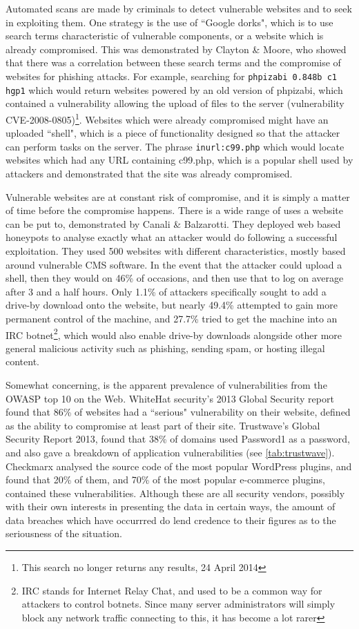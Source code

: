 \documentclass{acm_proc_article-sp}
\begin{document}
Automated scans are made by criminals to detect vulnerable websites and to seek in exploiting them.  One strategy is the use of ``Google dorks", which is to use search terms characteristic of vulnerable components, or a website which is already compromised.  This was demonstrated by Clayton \& Moore, who showed that there was a correlation between these search terms and the compromise of websites for phishing attacks\cite{mooreClayton}.  For example, searching for \texttt{phpizabi 0.848b c1 hgp1} which would return websites powered by an old version of phpizabi, which contained a vulnerability allowing the upload of files to the server (vulnerability CVE-2008-0805)\footnote{This search no longer returns any results, 24 April 2014}.  Websites which were already compromised might have an uploaded ``shell", which is a piece of functionality designed so that the attacker can perform tasks on the server.  The phrase \texttt{inurl:c99.php} which would locate websites which had any URL containing c99.php, which is a popular shell used by attackers and demonstrated that the site was already compromised.

Vulnerable websites are at constant risk of compromise, and it is simply a matter of time before the compromise happens.  There is a wide range of uses a website can be put to, demonstrated by Canali \& Balzarotti\cite{canali2013}.  They deployed web based honeypots to analyse exactly what an attacker would do following a successful exploitation.  They used 500 websites with different characteristics, mostly based around vulnerable CMS software.  In the event that the attacker could upload a shell, then they would on 46\% of occasions, and then use that to log on average after 3 and a half hours.  Only 1.1\% of attackers specifically sought to add a drive-by download onto the website, but nearly 49.4\% attempted to gain more permanent control of the machine, and 27.7\% tried to get the machine into an IRC botnet\footnote{IRC stands for Internet Relay Chat, and used to be a common way for attackers to control botnets.  Since many server administrators will simply block any network traffic connecting to this, it has become a lot rarer}, which would also enable drive-by downloads alongside other more general malicious activity such as phishing, sending spam, or hosting illegal content.

Somewhat concerning, is the apparent prevalence of vulnerabilities from the OWASP top 10 on the Web.  WhiteHat security's 2013 Global Security report found that 86\% of websites had a ``serious" vulnerability on their website, defined as the ability to compromise at least part of their site\cite{whitehat}.  Trustwave's Global Security Report 2013, found that 38\% of domains used Password1 as a password, and also gave a breakdown of application vulnerabilities (see \ref{tab:trustwave}).  Checkmarx analysed the source code of the most popular WordPress plugins, and found that 20\% of them, and 70\% of the most popular e-commerce plugins, contained these vulnerabilities.  Although these are all security vendors, possibly with their own interests in presenting the data in certain ways, the amount of data breaches which have occurrred do lend credence to their figures as to the seriousness of the situation.
\end{document}
